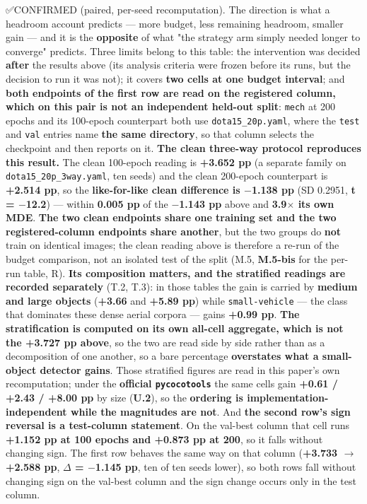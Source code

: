 \documentclass[pdflatex,sn-mathphys-ay]{sn-jnl}
\begin{document}
✅CONFIRMED (paired, per-seed recomputation). The direction is what a headroom account predicts --- more budget, less remaining headroom, smaller gain --- and it is the \textbf{opposite} of what "the strategy arm simply needed longer to converge" predicts. Three limits belong to this table: the intervention was decided \textbf{after} the results above (its analysis criteria were frozen before its runs, but the decision to run it was not); it covers \textbf{two cells at one budget interval}; and \textbf{both endpoints of the first row are read on the registered column, which on this pair is not an independent held-out split}: \texttt{mech} at 200 epochs and its 100-epoch counterpart both use \texttt{dota15\_20p.yaml}, where the \texttt{test} and \texttt{val} entries name \textbf{the same directory}, so that column selects the checkpoint and then reports on it. \textbf{The clean three-way protocol reproduces this result.} The clean 100-epoch reading is \textbf{+3.652 pp} (a separate family on \texttt{dota15\_20p\_3way.yaml}, ten seeds) and the clean 200-epoch counterpart is \textbf{+2.514 pp}, so the \textbf{like-for-like clean difference is \ensuremath{-}1.138 pp} (SD 0.2951, \textbf{t = \ensuremath{-}12.2}) --- within \textbf{0.005 pp} of the \textbf{\ensuremath{-}1.143 pp} above and \textbf{3.9\ensuremath{\times} its own MDE}. \textbf{The two clean endpoints share one training set and the two registered-column endpoints share another}, but the two groups do \textbf{not} train on identical images; the clean reading above is therefore a re-run of the budget comparison, not an isolated test of the split (M.5, \textbf{M.5-bis} for the per-run table, R). \textbf{Its composition matters, and the stratified readings are recorded separately} (T.2, T.3): in those tables the gain is carried by \textbf{medium and large objects} (\textbf{+3.66} and \textbf{+5.89 pp}) while \texttt{small-vehicle} --- the class that dominates these dense aerial corpora --- gains \textbf{+0.99 pp}. \textbf{The stratification is computed on its own all-cell aggregate, which is not the +3.727 pp above}, so the two are read side by side rather than as a decomposition of one another, so a bare percentage \textbf{overstates what a small-object detector gains}. Those stratified figures are read in this paper's own recomputation; under the \textbf{official \texttt{pycocotools}} the same cells gain \textbf{+0.61 / +2.43 / +8.00 pp} by size (\textbf{U.2}), so the \textbf{ordering is implementation-independent while the magnitudes are not}. And \textbf{the second row's sign reversal is a test-column statement}. On the val-best column that cell runs \textbf{+1.152 pp at 100 epochs and +0.873 pp at 200}, so it falls without changing sign. The first row behaves the same way on that column (\textbf{+3.733 \ensuremath{\rightarrow} +2.588 pp}, \textbf{\ensuremath{\Delta} = \ensuremath{-}1.145 pp}, ten of ten seeds lower), so both rows fall without changing sign on the val-best column and the sign change occurs only in the test column.
\end{document}
